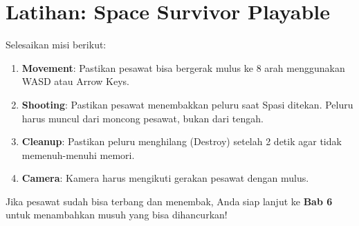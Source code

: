 
\section{Latihan: Space Survivor Playable}

Selesaikan misi berikut:

\begin{enumerate}
    \item \textbf{Movement}: Pastikan pesawat bisa bergerak mulus ke 8 arah menggunakan WASD atau Arrow Keys.
    \item \textbf{Shooting}: Pastikan pesawat menembakkan peluru saat Spasi ditekan. Peluru harus muncul dari moncong pesawat, bukan dari tengah.
    \item \textbf{Cleanup}: Pastikan peluru menghilang (Destroy) setelah 2 detik agar tidak memenuh-menuhi memori.
    \item \textbf{Camera}: Kamera harus mengikuti gerakan pesawat dengan mulus.
\end{enumerate}

Jika pesawat sudah bisa terbang dan menembak, Anda siap lanjut ke \textbf{Bab 6} untuk menambahkan musuh yang bisa dihancurkan!

